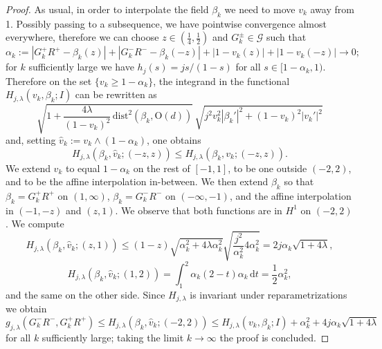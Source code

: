\documentclass[a4paper,reqno]{amsart}
\newcommand\dist{{\mathrm{dist}}}
\newcommand\dt{{\,\mathrm{d}t}}
\theoremstyle{remark}
\newcommand{\G}{\mathcal{G}}
\newcommand{\On}{\mathrm{O}(d)}
\numberwithin{equation}{section}
\begin{document}
\begin{proof}
As usual, in order to interpolate the field $\beta_k$ we need to move $v_k$ away from 1.
Possibly passing to a subsequence, we have pointwise convergence almost everywhere, therefore we can choose $z\in (\frac14,\frac12)$ and $G_k^\pm\in\G$ such that
\begin{equation}
\alpha_k:= |G_k^+R^+-\beta_k(z)|
+|G_k^-R^--\beta_k(-z)|
+|1-v_k(z)|+
|1-v_k(-z)|
\to0;
\end{equation}
for $k$ sufficiently  large we have $h_j(s)=js/(1-s)$ for all $s\in [1-\alpha_k,1)$. Therefore
on the set $\{v_k\ge 1-\alpha_k\}$, the integrand in
the functional
 $H_{j,\lambda}(v_k,\beta_k;I)$ can be rewritten as
\begin{equation}
\sqrt{1+ \frac{4\lambda}{(1-v_k)^2}\, \dist^2(\beta_k, \On)} \,\sqrt{j^2 v_k^2 |\beta_k'|^2+(1-v_k)^2|v_k'|^2}
\end{equation}
and, setting
$\widehat v_k:=v_k\wedge (1-\alpha_k)$, one obtains
\begin{equation}
H_{j,\lambda}(\beta_k,\widehat v_k;(-z,z))
 \le H_{j,\lambda}(\beta_k,v_k;(-z,z)).
\end{equation}
We extend $\widehat v_k$ to equal $1-\alpha_k$ on the rest of $[-1,1]$, to be one
outside $(-2,2)$, and to be the affine interpolation in-between.
We then extend $\beta_k$ so that $\beta_k=G_k^+R^+$
on $(1,\infty)$, $\beta_k=G_k^-R^-$ on $(-\infty,-1)$, and the affine interpolation in $(-1,-z)$ and $(z,1)$. We
observe that both functions are in $H^1$ on $(-2,2)$.
We compute
\begin{equation}
 H_{j,\lambda}(\beta_k,\widehat v_k;(z,1))
 \le (1-z) \sqrt{\alpha_k^2+4\lambda\alpha_k^2}
 \sqrt{\frac{j^2}{\alpha_k^2} 4\alpha_k^2}
 = 2 j \alpha_k \sqrt{1+4\lambda},
\end{equation}
\begin{equation}
 H_{j,\lambda}(\beta_k,\widehat v_k;(1,2))
 =\int_1^2 \alpha_k (2-t) \alpha_k\dt = \frac12 \alpha_k^2,
\end{equation}
and the same on the other side. Since $H_{j,\lambda}$ is invariant under reparametrizations we obtain
\begin{equation}
 g_{j,\lambda}(G_k^-R^-,G_k^+R^+)
 \le H_{j,\lambda} (\beta_k,\widehat v_k; (-2,2))
 \le  H_{j,\lambda}(v_k,\beta_k;I)
 +\alpha_k^2 + 4j\alpha_k\sqrt{1+4\lambda}
\end{equation}
for all $k$ sufficiently large;
 taking the limit $k\to\infty$ the proof is concluded.
\end{proof}
\end{document}
